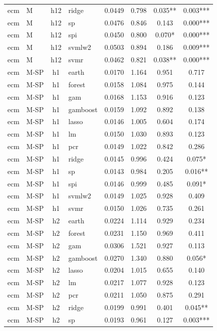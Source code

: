 \begin{ThreePartTable}
\begin{longtable}[t]{llclcccc}
ecm & M & h12 & ridge & 0.0449 & 0.798 & 0.035** & 0.003***\\
ecm & M & h12 & sp & 0.0476 & 0.846 & 0.143 & 0.000***\\
ecm & M & h12 & spi & 0.0450 & 0.800 & 0.070* & 0.000***\\
ecm & M & h12 & svmlw2 & 0.0503 & 0.894 & 0.186 & 0.009***\\
ecm & M & h12 & svmr & 0.0462 & 0.821 & 0.038** & 0.000***\\
\addlinespace
ecm & M-SP & h1 & earth & 0.0170 & 1.164 & 0.951 & 0.717\\
ecm & M-SP & h1 & forest & 0.0158 & 1.084 & 0.975 & 0.144\\
ecm & M-SP & h1 & gam & 0.0168 & 1.153 & 0.916 & 0.123\\
ecm & M-SP & h1 & gamboost & 0.0159 & 1.092 & 0.892 & 0.138\\
ecm & M-SP & h1 & lasso & 0.0146 & 1.005 & 0.604 & 0.174\\
ecm & M-SP & h1 & lm & 0.0150 & 1.030 & 0.893 & 0.123\\
ecm & M-SP & h1 & pcr & 0.0149 & 1.022 & 0.842 & 0.286\\
ecm & M-SP & h1 & ridge & 0.0145 & 0.996 & 0.424 & 0.075*\\
ecm & M-SP & h1 & sp & 0.0143 & 0.984 & 0.205 & 0.016**\\
ecm & M-SP & h1 & spi & 0.0146 & 0.999 & 0.485 & 0.091*\\
ecm & M-SP & h1 & svmlw2 & 0.0149 & 1.025 & 0.928 & 0.409\\
ecm & M-SP & h1 & svmr & 0.0150 & 1.026 & 0.735 & 0.261\\
\addlinespace
ecm & M-SP & h2 & earth & 0.0224 & 1.114 & 0.929 & 0.234\\
ecm & M-SP & h2 & forest & 0.0231 & 1.150 & 0.969 & 0.411\\
ecm & M-SP & h2 & gam & 0.0306 & 1.521 & 0.927 & 0.113\\
ecm & M-SP & h2 & gamboost & 0.0270 & 1.340 & 0.880 & 0.056*\\
ecm & M-SP & h2 & lasso & 0.0204 & 1.015 & 0.655 & 0.140\\
ecm & M-SP & h2 & lm & 0.0217 & 1.077 & 0.928 & 0.123\\
ecm & M-SP & h2 & pcr & 0.0211 & 1.050 & 0.875 & 0.291\\
ecm & M-SP & h2 & ridge & 0.0199 & 0.991 & 0.401 & 0.045**\\
ecm & M-SP & h2 & sp & 0.0193 & 0.961 & 0.127 & 0.003***\\

\end{longtable}
\end{ThreePartTable}
